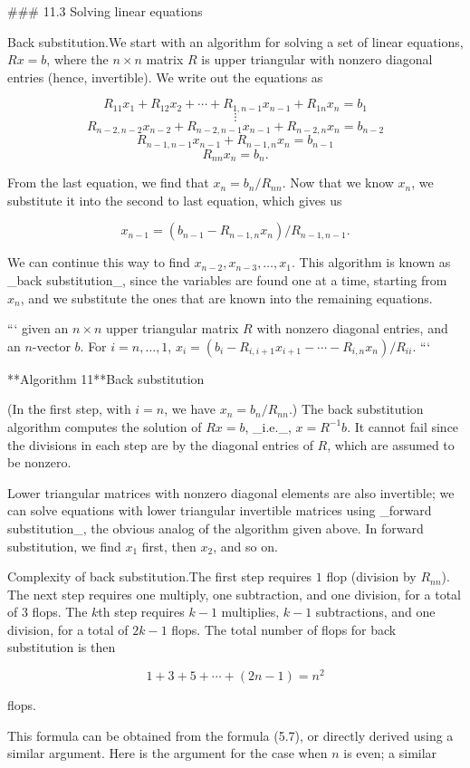 

### 11.3 Solving linear equations

Back substitution.We start with an algorithm for solving a set of linear equations, \(Rx=b\), where the \(n\times n\) matrix \(R\) is upper triangular with nonzero diagonal entries (hence, invertible). We write out the equations as

\[R_{11}x_{1}+R_{12}x_{2}+\cdots+R_{1,n-1}x_{n-1}+R_{1n}x_{n} = b_{1}\] \[\vdots\] \[R_{n-2,n-2}x_{n-2}+R_{n-2,n-1}x_{n-1}+R_{n-2,n}x_{n} = b_{n-2}\] \[R_{n-1,n-1}x_{n-1}+R_{n-1,n}x_{n} = b_{n-1}\] \[R_{nn}x_{n} = b_{n}.\]

From the last equation, we find that \(x_{n}=b_{n}/R_{nn}\). Now that we know \(x_{n}\), we substitute it into the second to last equation, which gives us

\[x_{n-1}=(b_{n-1}-R_{n-1,n}x_{n})/R_{n-1,n-1}.\]

We can continue this way to find \(x_{n-2},x_{n-3},\ldots,x_{1}\). This algorithm is known as _back substitution_, since the variables are found one at a time, starting from \(x_{n}\), and we substitute the ones that are known into the remaining equations.

``` given an \(n\times n\) upper triangular matrix \(R\) with nonzero diagonal entries, and an \(n\)-vector \(b\). For \(i=n,\ldots,1\), \(x_{i}=(b_{i}-R_{i,i+1}x_{i+1}-\cdots-R_{i,n}x_{n})/R_{ii}\). ```

**Algorithm 11**Back substitution

(In the first step, with \(i=n\), we have \(x_{n}=b_{n}/R_{nn}\).) The back substitution algorithm computes the solution of \(Rx=b\), _i.e._, \(x=R^{-1}b\). It cannot fail since the divisions in each step are by the diagonal entries of \(R\), which are assumed to be nonzero.

Lower triangular matrices with nonzero diagonal elements are also invertible; we can solve equations with lower triangular invertible matrices using _forward substitution_, the obvious analog of the algorithm given above. In forward substitution, we find \(x_{1}\) first, then \(x_{2}\), and so on.

Complexity of back substitution.The first step requires \(1\) flop (division by \(R_{nn}\)). The next step requires one multiply, one subtraction, and one division, for a total of \(3\) flops. The \(k\)th step requires \(k-1\) multiplies, \(k-1\) subtractions, and one division, for a total of \(2k-1\) flops. The total number of flops for back substitution is then

\[1+3+5+\cdots+(2n-1)=n^{2}\]

flops.

This formula can be obtained from the formula (5.7), or directly derived using a similar argument. Here is the argument for the case when \(n\) is even; a similar